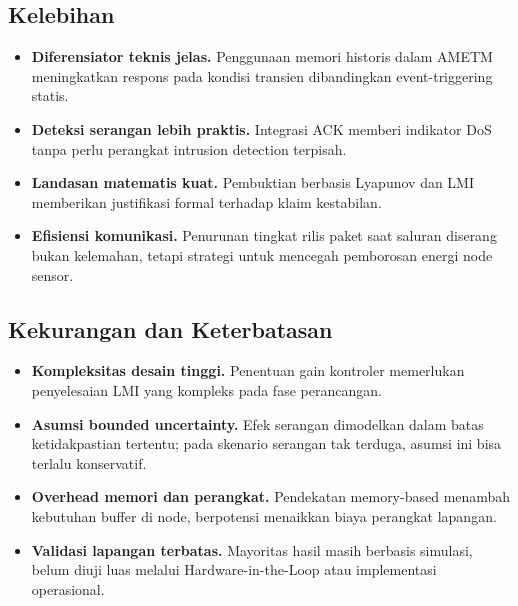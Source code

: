 \documentclass{article}
\begin{document}
\subsection*{Kelebihan}

\begin{itemize}[leftmargin=*]
    \item \textbf{Diferensiator teknis jelas.} Penggunaan memori historis
    dalam AMETM meningkatkan respons pada kondisi transien dibandingkan
    event-triggering statis.

    \item \textbf{Deteksi serangan lebih praktis.} Integrasi ACK memberi
    indikator DoS tanpa perlu perangkat intrusion detection terpisah.

    \item \textbf{Landasan matematis kuat.} Pembuktian berbasis Lyapunov
    dan LMI memberikan justifikasi formal terhadap klaim kestabilan.

    \item \textbf{Efisiensi komunikasi.} Penurunan tingkat rilis paket
    saat saluran diserang bukan kelemahan, tetapi strategi untuk
    mencegah pemborosan energi node sensor.
\end{itemize}

\subsection*{Kekurangan dan Keterbatasan}

\begin{itemize}[leftmargin=*]
    \item \textbf{Kompleksitas desain tinggi.}
    Penentuan gain kontroler memerlukan penyelesaian LMI yang kompleks
    pada fase perancangan.

    \item \textbf{Asumsi bounded uncertainty.}
    Efek serangan dimodelkan dalam batas ketidakpastian tertentu; pada
    skenario serangan tak terduga, asumsi ini bisa terlalu konservatif.

    \item \textbf{Overhead memori dan perangkat.}
    Pendekatan memory-based menambah kebutuhan buffer di node,
    berpotensi menaikkan biaya perangkat lapangan.

    \item \textbf{Validasi lapangan terbatas.}
    Mayoritas hasil masih berbasis simulasi, belum diuji luas melalui
    Hardware-in-the-Loop atau implementasi operasional.
\end{itemize}
\end{document}
